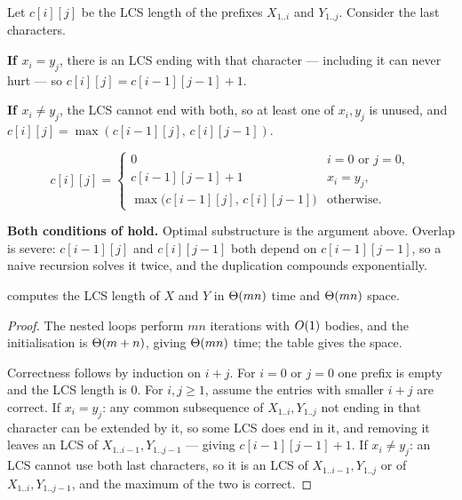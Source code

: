 \begin{conceptbox}
Let $c[i][j]$ be the LCS length of the prefixes $X_{1..i}$ and $Y_{1..j}$.
Consider the last characters.

\smallskip
\textbf{If $x_{i} = y_{j}$}, there is an LCS ending with that character ---
including it can never hurt --- so $c[i][j] = c[i-1][j-1] + 1$.

\smallskip
\textbf{If $x_{i} \ne y_{j}$}, the LCS cannot end with both, so at least one of
$x_{i}, y_{j}$ is unused, and $c[i][j] = \max(c[i-1][j],\, c[i][j-1])$.

\smallskip
\[ c[i][j] = \begin{cases}
   0 & i = 0 \text{ or } j = 0, \\
   c[i-1][j-1] + 1 & x_{i} = y_{j}, \\
   \max\bigl(c[i-1][j],\, c[i][j-1]\bigr) & \text{otherwise.}
   \end{cases} \]

\smallskip
\textbf{Both conditions of  hold.} Optimal substructure is the
argument above. Overlap is severe: $c[i-1][j]$ and $c[i][j-1]$ both depend on
$c[i-1][j-1]$, so a naive recursion solves it twice, and the duplication
compounds exponentially.
\end{conceptbox}


\begin{theorem}[LCS]\label{thm:lcs}
 computes the LCS length of $X$ and $Y$ in $\Theta(mn)$
time and $\Theta(mn)$ space.
\end{theorem}

\begin{proof}
The nested loops perform $mn$ iterations with $O(1)$ bodies, and the
initialisation is $\Theta(m+n)$, giving $\Theta(mn)$ time; the table gives the
space.

\smallskip
Correctness follows by induction on $i+j$. For $i = 0$ or $j = 0$ one prefix is
empty and the LCS length is 0. For $i, j \ge 1$, assume the entries with
smaller $i+j$ are correct. If $x_{i} = y_{j}$: any common subsequence of
$X_{1..i}, Y_{1..j}$ not ending in that character can be extended by it, so
some LCS does end in it, and removing it leaves an LCS of $X_{1..i-1},
Y_{1..j-1}$ --- giving $c[i-1][j-1]+1$. If $x_{i} \ne y_{j}$: an LCS cannot use
both last characters, so it is an LCS of $X_{1..i-1}, Y_{1..j}$ or of
$X_{1..i}, Y_{1..j-1}$, and the maximum of the two is correct.
\end{proof}

